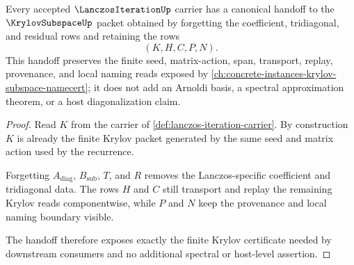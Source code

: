 \begin{theorem}
\label{thm:lanczos-iteration-krylov-handoff}
Every accepted $\LanczosIterationUp$ carrier has a canonical handoff to the $\KrylovSubspaceUp$ packet obtained by forgetting the coefficient, tridiagonal, and residual rows and retaining the rows
$$
(K,H,C,P,N).
$$
This handoff preserves the finite seed, matrix-action, span, transport, replay, provenance, and local naming reads exposed by \autoref{ch:concrete-instances-krylov-subspace-namecert}; it does not add an Arnoldi basis, a spectral approximation theorem, or a host diagonalization claim.
\end{theorem}
\begin{proof}
Read $K$ from the carrier of \autoref{def:lanczos-iteration-carrier}. By construction $K$ is already the finite Krylov packet generated by the same seed and matrix action used by the recurrence.

Forgetting $A_{\mathrm{diag}}$, $B_{\mathrm{sub}}$, $T$, and $R$ removes the Lanczos-specific coefficient and tridiagonal data. The rows $H$ and $C$ still transport and replay the remaining Krylov reads componentwise, while $P$ and $N$ keep the provenance and local naming boundary visible.

The handoff therefore exposes exactly the finite Krylov certificate needed by downstream consumers and no additional spectral or host-level assertion.
\end{proof}




